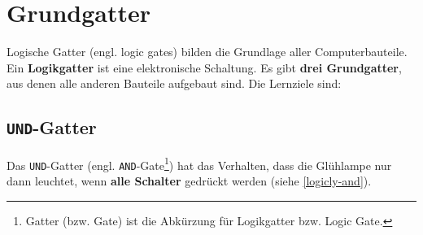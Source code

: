 
\toggletrue{image}
\togglefalse{imagehover}
\toggletrue{imagehover}

\chapter{Grundgatter}
\label{ch:grundgatter}

Logische Gatter (engl. logic gates) bilden die Grundlage aller Computerbauteile. Ein \textbf{Logikgatter} ist eine elektronische Schaltung. Es gibt \textbf{drei Grundgatter}, aus denen alle anderen Bauteile aufgebaut sind. Die Lernziele sind:\\


\vspace{-0.25cm}

\section{\texttt{UND}-Gatter}

Das \texttt{UND}-Gatter (engl. \texttt{AND}-Gate\footnote{Gatter (bzw. Gate) ist die Abkürzung für Logikgatter bzw. Logic Gate.}) hat das Verhalten, dass die Glühlampe nur dann leuchtet, wenn \textbf{alle Schalter} gedrückt werden (siehe \autoref{logicly-and}).

